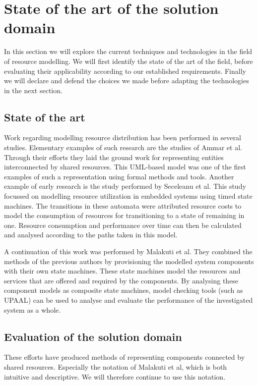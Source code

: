 \section{State of the art of the solution domain}
In this section we will explore the current techniques and technologies in the field of resource modelling. We will first identify the state of the art of the field, before evaluating their applicability according to our established requirements. Finally we will declare and defend the choices we made before adapting the technologies in the next section.

\subsection{State of the art}
Work regarding modelling resource distribution has been performed in several studies. Elementary examples of such research are the studies of Ammar et al\cite{rum_basis_2}. Through their efforts they laid the ground work for representing entities interconnected by shared resources. This UML-based model was one of the first examples of such a representation using formal methods and tools. Another example of early research is the study performed by Seceleanu et al\cite{rum_basis_89}. This study focussed on modelling resource utilization in embedded systems using timed state machines. The transitions in these automata were attributed resource costs to model the consumption of resources for transitioning to a state of remaining in one. Resource consumption and performance over time  can then be calculated and analysed according to the paths taken in this model.

A continuation of this work was performed by Malakuti et al\cite{steven-te-brinke}. They combined the methods of the previous authors by provisioning the modelled system components with their own state machines. These state machines model the resources and services that are offered and required by the components. By analysing these component models as composite state machines, model checking tools (such as UPAAL\cite{web:upaal}) can be used to analyse and evaluate the performance of the investigated system as a whole.

\subsection{Evaluation of the solution domain}
These efforts have produced methods of representing components connected by shared resources. Especially the notation of Malakuti et al\cite{steven-te-brinke}, which is both intuitive and descriptive. We will therefore continue to use this notation.


